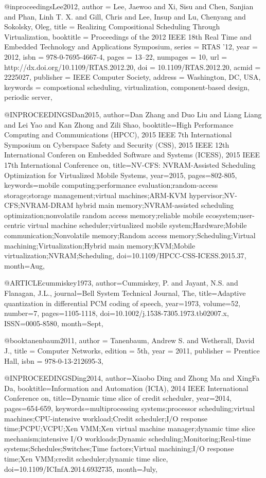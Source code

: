 @inproceedings{Lee2012,
 author = {Lee, Jaewoo and Xi, Sisu and Chen, Sanjian and Phan, Linh T. X. and Gill, Chris and Lee, Insup and Lu, Chenyang and Sokolsky, Oleg},
 title = {Realizing Compositional Scheduling Through Virtualization},
 booktitle = {Proceedings of the 2012 IEEE 18th Real Time and Embedded Technology and Applications Symposium},
 series = {RTAS '12},
 year = {2012},
 isbn = {978-0-7695-4667-4},
 pages = {13--22},
 numpages = {10},
 url = {http://dx.doi.org/10.1109/RTAS.2012.20},
 doi = {10.1109/RTAS.2012.20},
 acmid = {2225027},
 publisher = {IEEE Computer Society},
 address = {Washington, DC, USA},
 keywords = {compostional scheduling, virtualization, component-based design, periodic server},
} 

@INPROCEEDINGS{Dan2015, 
author={Dan Zhang and Duo Liu and Liang Liang and Lei Yao and Kan Zhong and Zili Shao}, 
booktitle={High Performance Computing and Communications (HPCC), 2015 IEEE 7th International Symposium on Cyberspace Safety and Security (CSS), 2015 IEEE 12th International Conferen on Embedded Software and Systems (ICESS), 2015 IEEE 17th International Conference on}, 
title={NV-CFS: NVRAM-Assisted Scheduling Optimization for Virtualized Mobile Systems}, 
year={2015}, 
pages={802-805}, 
keywords={mobile computing;performance evaluation;random-access storage;storage management;virtual machines;ARM-KVM hypervisor;NV-CFS;NVRAM-DRAM hybrid main memory;NVRAM-assisted scheduling optimization;nonvolatile random access memory;reliable mobile ecosystem;user-centric virtual machine scheduler;virtualized mobile system;Hardware;Mobile communication;Nonvolatile memory;Random access memory;Scheduling;Virtual machining;Virtualization;Hybrid main memory;KVM;Mobile virtualization;NVRAM;Scheduling}, 
doi={10.1109/HPCC-CSS-ICESS.2015.37}, 
month={Aug},}

@ARTICLE{cummiskey1973, 
author={Cummiskey, P. and Jayant, N.S. and Flanagan, J.L.}, 
journal={Bell System Technical Journal, The}, 
title={Adaptive quantization in differential PCM coding of speech}, 
year={1973}, 
volume={52}, 
number={7}, 
pages={1105-1118}, 
doi={10.1002/j.1538-7305.1973.tb02007.x}, 
ISSN={0005-8580}, 
month={Sept},}

@book{tanenbaum2011,
    author = {Tanenbaum, Andrew S. and Wetherall, David J.},
    title = {{Computer Networks}},
    edition = {5th},
    year = {2011},
    publisher = {Prentice Hall},
    isbn = {978-0-13-212695-3},
   }

@INPROCEEDINGS{Ding2014, 
author={Xiaobo Ding and Zhong Ma and XingFa Da}, 
booktitle={Information and Automation (ICIA), 2014 IEEE International Conference on}, 
title={Dynamic time slice of credit scheduler}, 
year={2014}, 
pages={654-659}, 
keywords={multiprocessing systems;processor scheduling;virtual machines;CPU-intensive workload;Credit scheduler;I/O response time;PCPU;VCPU;Xen VMM;Xen virtual machine manager;dynamic time slice mechanism;intensive I/O workloads;Dynamic scheduling;Monitoring;Real-time systems;Schedules;Switches;Time factors;Virtual machining;I/O response time;Xen VMM;credit scheduler;dynamic time slice}, 
doi={10.1109/ICInfA.2014.6932735}, 
month={July},}

